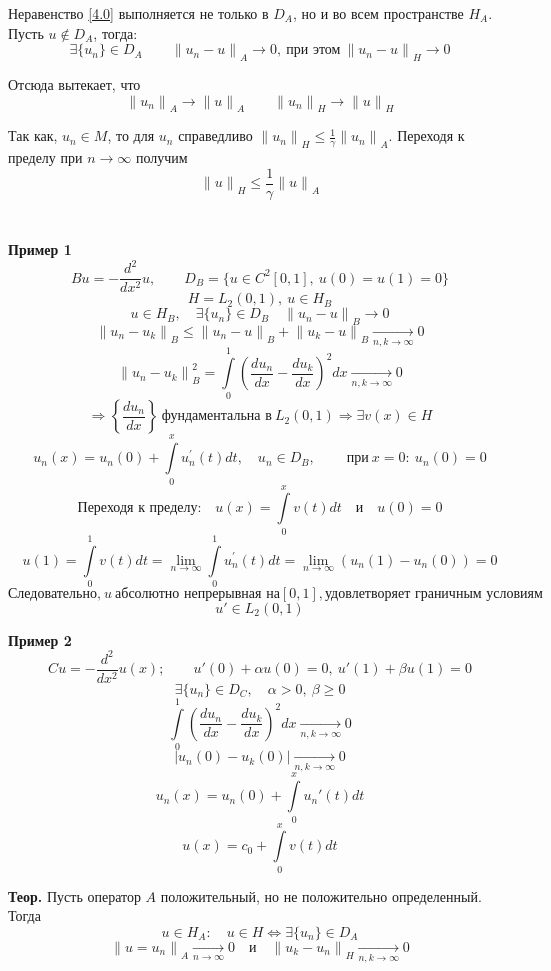 Неравенство \eqref{4.0} выполняется не только в $D_A$, но и во всем пространстве $H_A$. Пусть $u \notin D_A$, тогда:
\[ \exists \{u_n\} \in D_A \qquad {\|u_n - u\|}_A \rightarrow 0, \ \text{при этом} \ {\|u_n - u\|}_H \rightarrow 0 \]

Отсюда вытекает, что
\[ {\|u_n\|}_A \rightarrow {\|u\|}_A \qquad {\|u_n\|}_H \rightarrow {\|u\|}_H \]

Так как, $u_n \in M$, то для $u_n$ справедливо ${\|u_n\|}_H \leq \frac{1}{\gamma} {\|u_n\|}_A$. Переходя к пределу при $n \rightarrow \infty$ получим
\[ {\|u\|}_H \leq \frac{1}{\gamma} {\|u\|}_A \] \\ \\

\textbf{Пример 1}
\[ Bu = - \frac{d^2}{d x^2}u, \qquad D_{B} = \{u \in C^2 [0,1], \ u(0) = u(1) = 0 \} \]
\[ H = L_2 (0, 1), \ u \in H_B \]
\[ u \in H_B, \quad \exists \{u_n\} \in D_B \quad {\|u_n - u\|}_B \rightarrow 0 \]
\[ {\|u_n - u_k\|}_B \leq {\|u_n - u\|}_B + {\|u_k - u\|}_B \underset{n,k \rightarrow \infty}{\rightarrow} 0 \]
\[ {\|u_n - u_k\|}_B^2 = \int\limits_{0}^{1} {\left(\frac{du_n}{dx} - \frac{du_k}{dx} \right)}^2 dx \underset{n,k \rightarrow \infty}{\rightarrow} 0 \]
\[ \Rightarrow \left\{ \frac{du_n}{dx} \right\} \ \text{фундаментальна в} \ L_2(0,1) \Rightarrow \exists v(x) \in H\]
\[ u_n(x) = u_n(0) + \int\limits_{0}^{x} u_n^{'}(t) dt, \quad u_n \in D_B, \qquad \ \text{при} \ x=0:\ u_n(0) = 0 \]
\[ \text{Переходя к пределу:} \quad u(x) = \int\limits_{0}^{x} v(t) dt \quad \text{и} \quad u(0)=0\]
\[ u(1) = \int\limits_{0}^{1} v(t) dt = \lim\limits_{n \rightarrow \infty} \int\limits_{0}^{1} u_n^{'}(t) dt = \lim\limits_{n \rightarrow \infty} \left( u_n(1) - u_n(0) \right) = 0 \]
\[ \text{Следовательно,} \ u \ \text{абсолютно непрерывная на} [0,1], \text{удовлетворяет граничным условиям}\]
\[ u' \in L_2(0,1) \]

\textbf{Пример 2}
\[ Cu = - \frac{d^2}{dx^2} u(x); \qquad u'(0)+\alpha u(0)=0, \ u'(1) + \beta u(1)=0 \]
\[ \exists \{u_n\} \in D_C, \quad \alpha > 0, \ \beta \geq 0 \]
\[ \int\limits_{0}^{1} {\left( \frac{du_n}{dx} - \frac{du_k}{dx} \right)}^2 dx \underset{n, k \rightarrow \infty}{\rightarrow} 0 \]
\[ |u_n(0) - u_k(0)| \underset{n, k \rightarrow \infty}{\rightarrow} 0 \]
\[ u_n(x) = u_n(0) + \int\limits_{0}^{x} u_n'(t) dt \]
\[ u(x) = c_0 + \int\limits_{0}^{x} v(t) dt \]

\textbf{Теор.} Пусть оператор $A$ положительный, но не положительно определенный. Тогда
\[ u \in H_A: \quad u \in H \Leftrightarrow \exists \{ u_n \} \in D_A \]
\[ {\| u = u_n \|}_A \underset{n \rightarrow \infty}{\rightarrow} 0 \quad \text{и} \quad {\| u_k - u_n \|}_H \underset{n,k \rightarrow \infty}{\rightarrow} 0 \]

